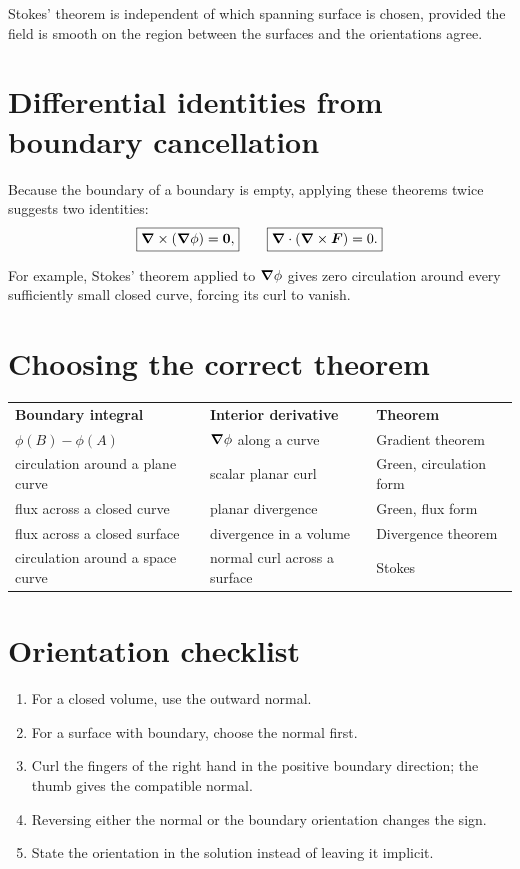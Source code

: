 \documentclass[11pt,a4paper]{article}
\begin{document}
Stokes' theorem is independent of which spanning surface is chosen, provided the field is smooth on the region between the surfaces and the orientations agree.

\section{Differential identities from boundary cancellation}

Because the boundary of a boundary is empty, applying these theorems twice suggests two identities:
\[
\boxed{\boldsymbol\nabla\times(\boldsymbol\nabla\phi)=\bm{0},}
\qquad
\boxed{\boldsymbol\nabla\cdot(\boldsymbol\nabla\times\bm{F})=0.}
\]

For example, Stokes' theorem applied to $\boldsymbol\nabla\phi$ gives zero circulation around every sufficiently small closed curve, forcing its curl to vanish.

\section{Choosing the correct theorem}

\begin{center}
\begin{tabular}{p{}p{}p{}}
\textbf{Boundary integral} & \textbf{Interior derivative} & \textbf{Theorem}\\[1mm]
$\phi(B)-\phi(A)$ & $\boldsymbol\nabla\phi$ along a curve & Gradient theorem\\
circulation around a plane curve & scalar planar curl & Green, circulation form\\
flux across a closed curve & planar divergence & Green, flux form\\
flux across a closed surface & divergence in a volume & Divergence theorem\\
circulation around a space curve & normal curl across a surface & Stokes\\
\end{tabular}
\end{center}

\section{Orientation checklist}

\begin{enumerate}
\item For a closed volume, use the outward normal.
\item For a surface with boundary, choose the normal first.
\item Curl the fingers of the right hand in the positive boundary direction; the thumb gives the compatible normal.
\item Reversing either the normal or the boundary orientation changes the sign.
\item State the orientation in the solution instead of leaving it implicit.
\end{enumerate}
\end{document}
